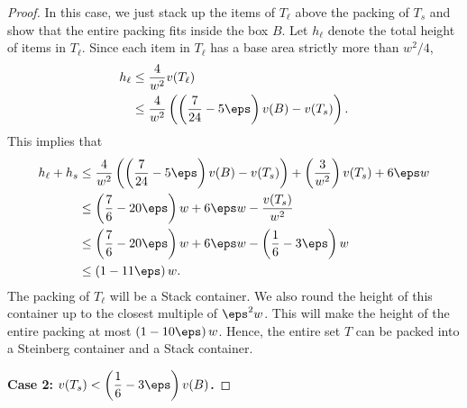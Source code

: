 \begin{proof}
In this case, we just stack up the items of $T_\ell$ above the packing of $T_s$ and show that the entire packing fits inside the box $B$.
Let $h_\ell$ denote the total height of items in $T_\ell$.
Since each item in $T_\ell$ has a base area strictly more than $w^2/4$,
\begin{align*}
    h_{\ell}&\le \frac{4}{w^2}v(T_\ell)\\
    &\le \frac{4}{w^2}\left(\left(\frac{7}{24}-5\eps\right)v(B)-v(T_s)\right).
\end{align*}
This implies that
\begin{align*}
    h_{\ell}+h_s&\le \frac{4}{w^2}\left(\left(\frac{7}{24}-5\eps\right)v(B)-v(T_s)\right)+\left(\frac{3}{w^2}\right)v(T_s)+6\eps w\\
            &\le \left(\frac76-20\eps\right)w+6\eps w-\frac{v(T_s)}{w^2}\\
            &\le \left(\frac76-20\eps\right)w+6\eps w-\left(\frac{1}{6}-3\eps\right)w\\
            &\le \left(1-11\eps\right)w.
\end{align*}
The packing of $T_{\ell}$ will be a Stack container.
We also round the height of this container up to the closest multiple of $\eps^2 w$. This will make the height of the entire packing at most
$\left(1-10\eps\right)w$.
Hence, the entire set $T$ can be packed into a Steinberg container and a Stack container.

\textbf{Case 2: $\displaystyle v(T_s)< \left(\frac16-3\eps\right)v(B)$.}


\end{proof}
